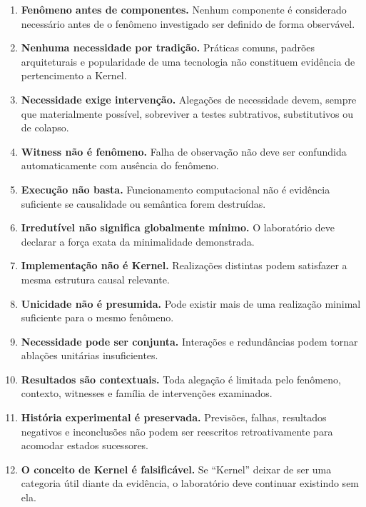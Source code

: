\documentclass[11pt,a4paper]{article}
\begin{document}
\begin{enumerate}[label=\textbf{P\arabic*.}]
  \item \textbf{Fenômeno antes de componentes.}
  Nenhum componente é considerado necessário antes de o fenômeno investigado ser
  definido de forma observável.

  \item \textbf{Nenhuma necessidade por tradição.}
  Práticas comuns, padrões arquiteturais e popularidade de uma tecnologia não
  constituem evidência de pertencimento a Kernel.

  \item \textbf{Necessidade exige intervenção.}
  Alegações de necessidade devem, sempre que materialmente possível, sobreviver a
  testes subtrativos, substitutivos ou de colapso.

  \item \textbf{Witness não é fenômeno.}
  Falha de observação não deve ser confundida automaticamente com ausência do
  fenômeno.

  \item \textbf{Execução não basta.}
  Funcionamento computacional não é evidência suficiente se causalidade ou semântica
  forem destruídas.

  \item \textbf{Irredutível não significa globalmente mínimo.}
  O laboratório deve declarar a força exata da minimalidade demonstrada.

  \item \textbf{Implementação não é Kernel.}
  Realizações distintas podem satisfazer a mesma estrutura causal relevante.

  \item \textbf{Unicidade não é presumida.}
  Pode existir mais de uma realização minimal suficiente para o mesmo fenômeno.

  \item \textbf{Necessidade pode ser conjunta.}
  Interações e redundâncias podem tornar ablações unitárias insuficientes.

  \item \textbf{Resultados são contextuais.}
  Toda alegação é limitada pelo fenômeno, contexto, witnesses e família de
  intervenções examinados.

  \item \textbf{História experimental é preservada.}
  Previsões, falhas, resultados negativos e inconclusões não podem ser reescritos
  retroativamente para acomodar estados sucessores.

  \item \textbf{O conceito de Kernel é falsificável.}
  Se ``Kernel'' deixar de ser uma categoria útil diante da evidência, o laboratório
  deve continuar existindo sem ela.
\end{enumerate}
\end{document}
